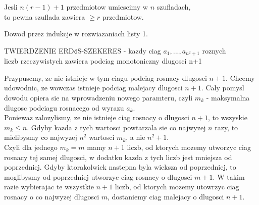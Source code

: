 \documentclass{article}
\begin{document}
  \begin{center}
    \color{emp}Jesli $n(r-1)+1$ przedmiotow umiescimy w $n$ szufladach, \\to pewna szuflada zawiera $\geq r$ przedmiotow.
  \end{center}
  Dowod przez indukcje w rozwiazaniach listy 1.
  \begin{center}
    \color{def}TWIERDZENIE ERD$\overset{\texttt{..}}{\texttt{o}}$S-SZEKERES - \color{txt}kazdy ciag $a_1, ..., a_{n^2+1}$ roznych \\liczb rzeczywistych zawiera podciag monotoniczny dlugosci n+1
  \end{center}
  Przypuscmy, ze nie istnieje w tym ciagu podciag rosnacy dlugosci $n+1$. Chcemy udowodnic, ze wowczas istnieje podciag malejacy dlugosci $n+1$. Caly pomysl dowodu opiera sie na wprowadzeniu \color{acc}nowego paramteru, czyli $m_k$ \color{txt}- maksymalna dlugosc podciagu rosnacego od wyrazu $a_k$.\\
  Poniewaz zalozylismy, ze nie istnieje ciag rosnacy o dlugosci $n+1$, to wszyskie $m_k\leq n$. Gdyby kazda z tych wartosci powtarzala sie co najwyzej $n$ razy, to mielibysmy co najwyzej $n^2$ wartosci $m_k$, a nie $n^2+1$. \\
  Czyli dla jednego $m_k=m$ mamy $n+1$ liczb, od ktorych mozemy utworzyc ciag rosnacy tej samej dlugosci, w dodatku kazda z tych liczb jest mniejsza od poprzedniej. Gdyby ktorakolwiek nastepna byla wieksza od poprzedniej, to moglibysmy od poprzedniej utworzyc ciag rosnacy o dlugosci $m+1$. W takim razie wybierajac te wszystkie $n+1$ liczb, od ktorych mozemy utowrzyc ciag rosnacy o co najwyzej dlugosci $m$, dostaniemy ciag malejacy o dlugosci $n+1$.
\end{document}
